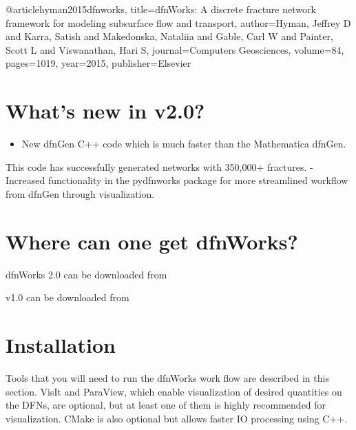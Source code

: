 \documentclass[letterpaper,10pt,english]{sphinxmanual}
\begin{document}

\begin{sphinxVerbatim}[commandchars=\\\{\}]
  @article\PYGZob{}hyman2015dfnworks,
    title=\PYGZob{}dfnWorks: A discrete fracture network framework
for modeling subsurface flow and transport\PYGZcb{},
    author=\PYGZob{}Hyman, Jeffrey D and Karra, Satish and Makedonska,
Nataliia and Gable, Carl W and Painter, Scott L
and Viswanathan, Hari S\PYGZcb{},
    journal=\PYGZob{}Computers \PYGZbs{}\PYGZam{} Geosciences\PYGZcb{},
    volume=\PYGZob{}84\PYGZcb{},
    pages=\PYGZob{}10\PYGZhy{}\PYGZhy{}19\PYGZcb{},
    year=\PYGZob{}2015\PYGZcb{},
    publisher=\PYGZob{}Elsevier\PYGZcb{}
  \PYGZcb{}
\end{sphinxVerbatim}


\section{What's new in v2.0?}
\label{\detokenize{intro:what-s-new-in-v2-0}}\begin{itemize}
\item {} 
New dfnGen C++ code which is much faster than the Mathematica dfnGen.

\end{itemize}

This code has successfully generated networks with 350,000+ fractures.
- Increased functionality in the pydfnworks package for more streamlined
workflow from dfnGen through visualization.


\section{Where can one get dfnWorks?}
\label{\detokenize{intro:where-can-one-get-dfnworks}}
dfnWorks 2.0 can be downloaded from 

v1.0 can be downloaded from 


\section{Installation}
\label{\detokenize{intro:installation}}
Tools that you will need to run the dfnWorks work flow are described in
this section. VisIt and ParaView, which enable visualization of desired
quantities on the DFNs, are optional, but at least one of them is highly
recommended for visualization. CMake is also optional but allows faster IO
processing using C++.
\end{document}
